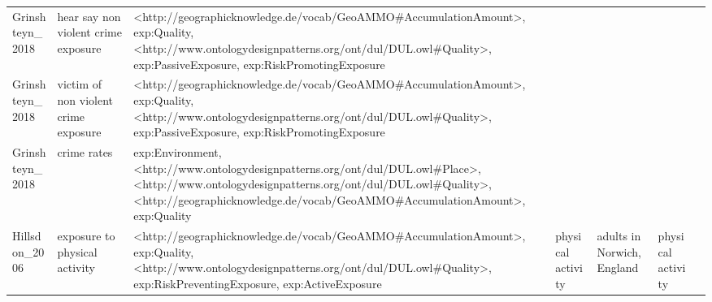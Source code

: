 \begin{tabular}{p{1cm}p{1cm}p{1cm}p{1cm}p{1cm}p{1cm}p{1cm}}
Grinshteyn\_2018 & hear say non violent crime exposure & <http://geographicknowledge.de/vocab/GeoAMMO\#AccumulationAmount>, exp:Quality, <http://www.ontologydesignpatterns.org/ont/dul/DUL.owl\#Quality>, exp:PassiveExposure, exp:RiskPromotingExposure &  &  &  &  \\
Grinshteyn\_2018 & victim of non violent crime exposure & <http://geographicknowledge.de/vocab/GeoAMMO\#AccumulationAmount>, exp:Quality, <http://www.ontologydesignpatterns.org/ont/dul/DUL.owl\#Quality>, exp:PassiveExposure, exp:RiskPromotingExposure &  &  &  &  \\
Grinshteyn\_2018 & crime rates & exp:Environment, <http://www.ontologydesignpatterns.org/ont/dul/DUL.owl\#Place>, <http://www.ontologydesignpatterns.org/ont/dul/DUL.owl\#Quality>, <http://geographicknowledge.de/vocab/GeoAMMO\#AccumulationAmount>, exp:Quality &  &  &  &  \\
Hillsdon\_2006 & exposure to physical activity & <http://geographicknowledge.de/vocab/GeoAMMO\#AccumulationAmount>, exp:Quality, <http://www.ontologydesignpatterns.org/ont/dul/DUL.owl\#Quality>, exp:RiskPreventingExposure, exp:ActiveExposure & physical activity & adults in Norwich, England & physical activity &  \\
\bottomrule
\end{tabular}

